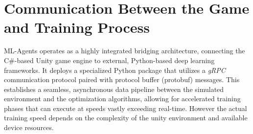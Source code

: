 \section{Communication Between the Game and Training Process}
ML-Agents operates as a highly integrated bridging architecture, connecting the C\#-based Unity game engine to external, Python-based deep learning frameworks. It deploys a specialized Python package that utilizes a \textit{gRPC} communication protocol paired with protocol buffer (protobuf) messages. This establishes a seamless, asynchronous data pipeline between the simulated environment and the optimization algorithms, allowing for accelerated training phases that can execute at speeds vastly exceeding real-time. However the actual training speed depends on the complexity of the unity environment and available device resources. 

